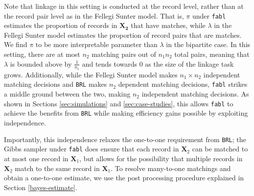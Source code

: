 \documentclass[ba]{imsart}
\begin{document}

Note that linkage in this setting is conducted at the record level, rather than at the record pair level as in the Fellegi Sunter model. That is, $\pi$ under \texttt{fabl} estimates the proportion of records in $\bm{X_2}$ that have matches, while $\lambda$ in the Fellegi Sunter model estimates the proportion of record pairs that are matches. We find $\pi$ to be more interpretable parameter than $\lambda$ in the bipartite case. In this setting, there are at most $n_2$ matching pairs out of $n_1 n_2$ total pairs, meaning that $\lambda$ is bounded above by $\frac{1}{n_1}$ and tends towards 0 as the size of the linkage task grows. Additionally, while the Fellegi Sunter model makes $n_1 \times n_2$ independent matching decisions and \texttt{BRL} makes $n_2$ dependent matching decisions, \texttt{fabl} strikes a middle ground between the two, making $n_2$  independent matching decisions. As shown in Sections \ref{sec:simulations} and \ref{sec:case-studies}, this allows \texttt{fabl} to achieve the benefits from \texttt{BRL} while making efficiency gains possible by exploiting independence. 

Importantly, this independence relaxes the one-to-one requirement from \texttt{BRL}; the Gibbs sampler under \texttt{fabl} does ensure that each record in \(\bm{X}_2\) can be matched to at most one record in \(\bm{X}_1\), but allows for the possibility that multiple records in \(\bm{X}_2\) match to the same record in \(\bm{X}_1\). To resolve many-to-one matchings and obtain a one-to-one estimate, we use the post processing procedure explained in Section \ref{bayes-estimate}.
\end{document}
